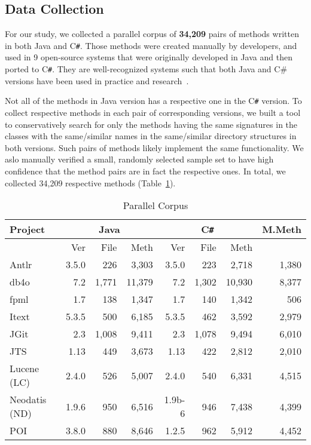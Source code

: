 \subsection{Data Collection}

For our study, we collected a parallel corpus of \textbf{34,209} pairs
of methods written in both Java and C\texttt{\#}. Those methods were
created manually by developers, and used in 9 open-source systems that
were originally developed in Java and then ported to
C\texttt{\#}. They are well-recognized systems such that both Java and
C\# versions have been used in practice and research~\cite{ase15}.

Not all of the methods in Java version has a respective one in the
C\texttt{\#} version. To collect respective methods in each pair of
corresponding versions, we built a tool to conservatively search for
only the methods having the same signatures in the classes with the
same/similar names in the same/similar directory structures in both
versions. Such pairs of methods likely implement the same
functionality. We aslo manually verified a small, randomly selected
sample set to have high confidence that the method pairs are in fact
the respective ones. In total, we collected 34,209 respective methods
(Table~\ref{tab:systems}).

\begin{table}[t]
       \small
	\tabcolsep 3pt
  \centering
  \caption{Parallel Corpus}
    \begin{tabular}{l|rrr|rrr|r}
    \toprule
    Project & \multicolumn{3}{c}{Java} \vline& \multicolumn{3}{c}{C\texttt{\#}} \vline& M.Meth \\
    \hline
		& Ver   &File 		&Meth 	&Ver 			&File 		&Meth 		&  \\
		\hline					
    Antlr~\cite{Antlr} 		   & 3.5.0 & 226   	& 3,303  & 3.5.0 	& 223   	& 2,718  	& 1,380 \\
    db4o~\cite{db4o}  		   & 7.2   & 1,771 	& 11,379 & 7.2   	& 1,302  	& 10,930 	& 8,377 \\
    fpml~\cite{fpml}  		   & 1.7   & 138   	& 1,347  & 1.7   	& 140   	& 1,342  	& 506 \\
    Itext~\cite{Itext} 		   & 5.3.5 & 500   	& 6,185  & 5.3.5 	& 462   	& 3,592  	& 2,979 \\
    JGit~\cite{JGit}  		   & 2.3   & 1,008 	& 9,411  & 2.3   	& 1,078  	& 9,494  	& 6,010 \\
    JTS~\cite{JTS}   		   & 1.13  & 449   	& 3,673  & 1.13  	& 422   	& 2,812  	& 2,010 \\
    Lucene (LC)~\cite{Lucene}  	   & 2.4.0 & 526   	& 5,007  & 2.4.0 	& 540   	& 6,331  	& 4,515 \\
    Neodatis (ND)~\cite{Neodatis}       & 1.9.6 & 950   	& 6,516  & 1.9b-6       & 946           & 7,438 	& 4,399 \\
    POI~\cite{POI}   		   & 3.8.0 & 880        & 8,646  & 1.2.5 	& 962   	& 5,912  	& 4,452 \\
    \bottomrule
    \end{tabular}%
  \label{tab:systems}%
\end{table}%

